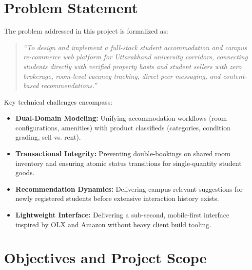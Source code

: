 \section{Problem Statement}
The problem addressed in this project is formalized as:
\begin{quote}
\textit{``To design and implement a full-stack student accommodation and campus re-commerce web platform for Uttarakhand university corridors, connecting students directly with verified property hosts and student sellers with zero brokerage, room-level vacancy tracking, direct peer messaging, and content-based recommendations.''}
\end{quote}

Key technical challenges encompass:
\begin{itemize}
    \item \textbf{Dual-Domain Modeling:} Unifying accommodation workflows (room configurations, amenities) with product classifieds (categories, condition grading, sell vs. rent).
    \item \textbf{Transactional Integrity:} Preventing double-bookings on shared room inventory and ensuring atomic status transitions for single-quantity student goods.
    \item \textbf{Recommendation Dynamics:} Delivering campus-relevant suggestions for newly registered students before extensive interaction history exists.
    \item \textbf{Lightweight Interface:} Delivering a sub-second, mobile-first interface inspired by OLX and Amazon without heavy client build tooling.
\end{itemize}

\section{Objectives and Project Scope}

